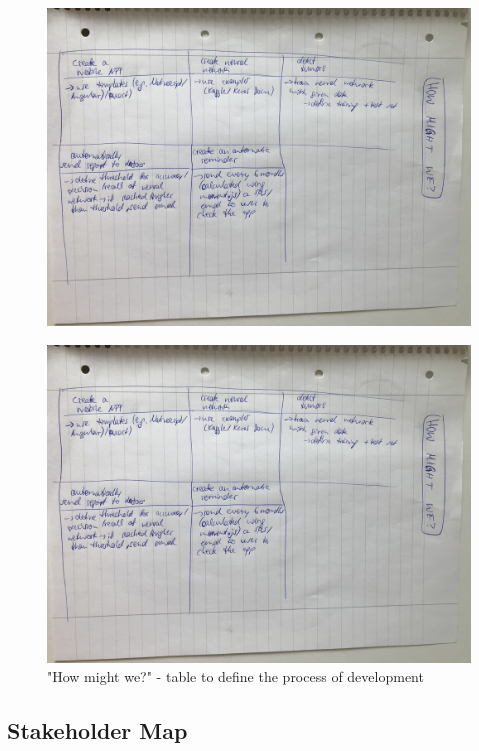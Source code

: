 \begin{figure}[h]
\includegraphics[scale=0.55, natwidth=1024, natheight=200]{images/howmightwe.jpg}
\end{figure}

\begin{figure}[h!]
	\centering
	\includegraphics[width=1\textwidth]{images/howmightwe.jpg}
	\caption{"How might we?" - table to define the process of development}
	\label{howmightwe}
\end{figure}

\subsection{Stakeholder Map}

